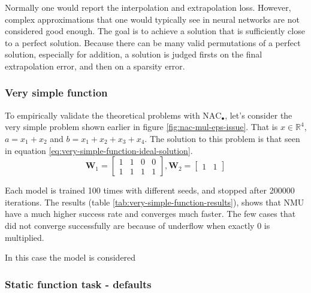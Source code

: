 Normally one would report the interpolation and extrapolation loss. However, complex approximations that one would typically see in neural networks are not considered good enough. The goal is to achieve a solution that is sufficiently close to a perfect solution. Because there can be many valid permutations of a perfect solution, especially for addition, a solution is judged firsts on the final extrapolation error, and then on a sparsity error.



\subsubsection{Very simple function}

To empirically validate the theoretical problems with $\mathrm{NAC}_{\bullet}$, let's consider the very simple problem shown earlier in figure \ref{fig:nac-mul-eps-issue}. That is $x \in \mathbb{R}^4$, $a = x_1 + x_2$ and $b = x_1 + x_2 + x_3 + x_4$. The solution to this problem is that seen in equation \ref{eq:very-simple-function-ideal-solution}.
\begin{equation}
    \mathbf{W}_1 = \begin{bmatrix}
    1 & 1 & 0 & 0 \\
    1 & 1 & 1 & 1
    \end{bmatrix}, \mathbf{W}_2 = \begin{bmatrix}
    1 & 1
    \end{bmatrix}
    \label{eq:very-simple-function-ideal-solution}
\end{equation}

Each model is trained 100 times with different seeds, and stopped after 200000 iterations. The results (table \ref{tab:very-simple-function-results}), shows that NMU have a much higher success rate and converges much faster. The few cases that did not converge successfully are because of underflow when exactly 0 is multiplied.


In this case the model is considered 



\subsubsection{Static function task - defaults}


